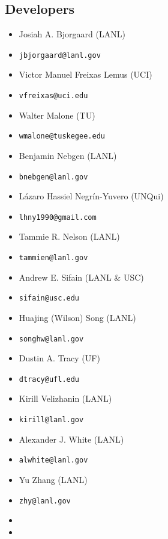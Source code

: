 \subsection{Developers}
\begin{multicols}{2}
\begin{itemize}
\item Josiah A. Bjorgaard (LANL)
\item[] \vspace*{-.75em}\verb+jbjorgaard@lanl.gov+
\item Victor Manuel Freixas Lemus (UCI)
\item[] \vspace*{-.75em}\verb+vfreixas@uci.edu+
\item Walter Malone (TU)
\item[] \vspace*{-.75em}\verb+wmalone@tuskegee.edu +
\item Benjamin Nebgen (LANL)
\item[] \vspace*{-.75em}\verb+bnebgen@lanl.gov+
\item Lázaro Hassiel Negrín-Yuvero (UNQui)
\item[] \vspace*{-.75em}\verb+lhny1990@gmail.com+
\item Tammie R. Nelson (LANL)
\item[] \vspace*{-.75em}\verb+tammien@lanl.gov+
\item Andrew E. Sifain (LANL \& USC)
\item[] \vspace*{-.75em}\verb+sifain@usc.edu+
\item Huajing (Wilson) Song (LANL)
\item[] \vspace*{-.75em}\verb+songhw@lanl.gov+
\item Dustin A. Tracy (UF)
\item[] \vspace*{-.75em}\verb+dtracy@ufl.edu+
\item Kirill Velizhanin (LANL)
\item[] \vspace*{-.75em}\verb+kirill@lanl.gov+
\item Alexander J. White (LANL)
\item[] \vspace*{-.75em}\verb+alwhite@lanl.gov+
\item Yu Zhang (LANL)
\item[] \vspace*{-.75em}\verb+zhy@lanl.gov+
\item[]
\item[]
\end{itemize}
\end{multicols}